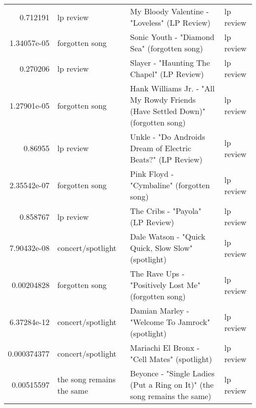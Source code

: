\documentclass[letterpaper,10pt]{article}
\begin{document}
\begin{table}[H]
\begin{adjustbox}{max width=\linewidth}
\begin{tabular}{rlll}
  0.712191    & lp review                 & My Bloody Valentine - "Loveless" (LP Review)                                                                 & lp review                 \\
  1.34057e-05 & forgotten song            & Sonic Youth - "Diamond Sea" (forgotten song)                                                                 & lp review                 \\
  0.270206    & lp review                 & Slayer - "Haunting The Chapel" (LP Review)                                                                   & lp review                 \\
  1.27901e-05 & forgotten song            & Hank Williams Jr. - "All My Rowdy Friends (Have Settled Down)" (forgotten song)                              & lp review                 \\
  0.86955     & lp review                 & Unkle - "Do Androids Dream of Electric Beats?" (LP Review)                                                   & lp review                 \\
  2.35542e-07 & forgotten song            & Pink Floyd - "Cymbaline" (forgotten song)                                                                    & lp review                 \\
  0.858767    & lp review                 & The Cribs - "Payola" (LP Review)                                                                             & lp review                 \\
  7.90432e-08 & concert/spotlight         & Dale Watson - "Quick Quick, Slow Slow" (spotlight)                                                           & lp review                 \\
  0.00204828  & forgotten song            & The Rave Ups - "Positively Lost Me" (forgotten song)                                                         & lp review                 \\
  6.37284e-12 & concert/spotlight         & Damian Marley - "Welcome To Jamrock" (spotlight)                                                             & lp review                 \\
  0.000374377 & concert/spotlight         & Mariachi El Bronx - "Cell Mates" (spotlight)                                                                 & lp review                 \\
  0.00515597  & the song remains the same & Beyonce - "Single Ladies (Put a Ring on It)" (the song remains the same)                                     & lp review                 \\

\end{tabular}
\end{adjustbox}
\end{table}
\end{document}
